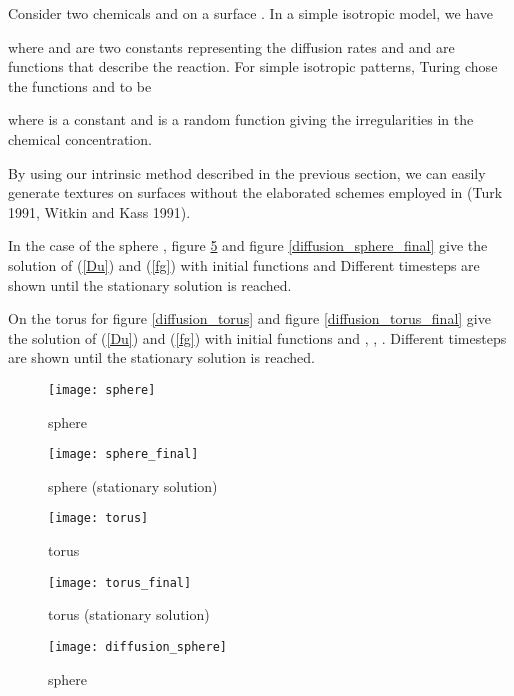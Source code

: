 \documentclass{elsart}
\begin{document}
Consider two chemicals  and  on a surface . In a
simple isotropic model, we have



where  and  are two constants representing the
diffusion rates and  and  are functions that describe the
reaction. For simple isotropic patterns, Turing chose the functions
 and  to be


where  is a constant and  is a random function giving the
irregularities in the chemical concentration.

    By using our intrinsic method described in the previous section, we
can easily generate textures on surfaces without the elaborated
schemes employed in (Turk 1991, Witkin and Kass 1991).

In the case of the sphere , figure \ref{diffusion_sphere} and
figure \ref{diffusion_sphere_final} give the solution of (\ref{Du})
and (\ref{fg}) with initial functions and Different timesteps are
shown until the stationary solution is reached.


On the torus  for  figure \ref{diffusion_torus}
and figure \ref{diffusion_torus_final} give the solution of
(\ref{Du}) and (\ref{fg}) with initial functions  and , , .
Different timesteps are shown until the stationary solution is
reached.



\begin{figure}
{\center
\texttt{[image: sphere]}
\caption{sphere}\label{sphere}
 }
\end{figure}


\begin{figure}
{\center
\texttt{[image: sphere\_final]}
\caption{sphere (stationary solution) }\label{shpere_final}
 }
\end{figure}







\begin{figure}
{\center
\texttt{[image: torus]}
\caption{torus}\label{torus}
 }
\end{figure}

\begin{figure}
{\center
\texttt{[image: torus\_final]}
\caption{torus (stationary solution)}\label{torus_final}
 }
\end{figure}



\begin{figure}
{\center
\texttt{[image: diffusion\_sphere]}
\caption{sphere}\label{diffusion_sphere}
 }
\end{figure}
\end{document}
